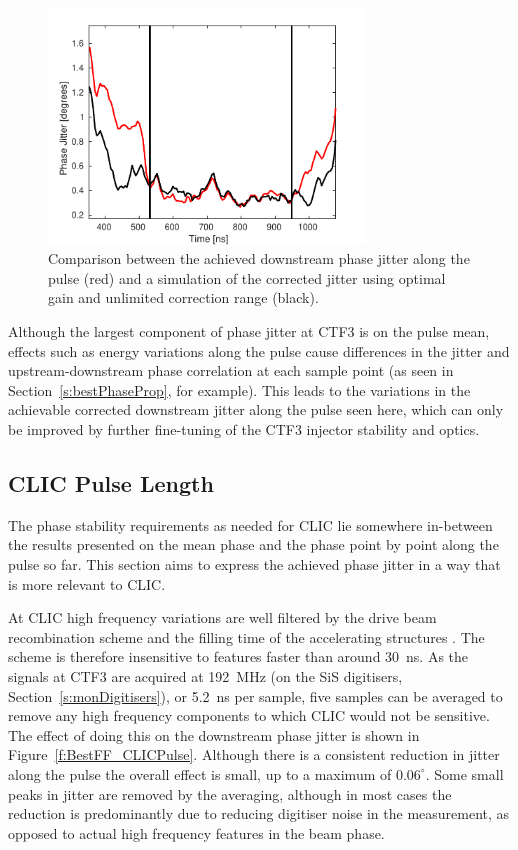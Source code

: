 \begin{figure}
  \centering
  \includegraphics[width=0.75\textwidth]{Figures/feedforward/BestFF_SimStdAlongPulse}
  \caption{Comparison between the achieved downstream phase jitter along the pulse (red) and a simulation of the corrected jitter using optimal gain and unlimited correction range (black).}
  \label{f:BestFF_SimStdPhaseAlong}
\end{figure}

Although the largest component of phase jitter at CTF3 is on the pulse mean, effects such as energy variations along the pulse cause differences in the jitter and upstream-downstream phase correlation at each sample point (as seen in Section~\ref{s:bestPhaseProp}, for example). This leads to the variations in the achievable corrected downstream jitter along the pulse seen here, which can only be improved by further fine-tuning of the CTF3 injector stability and optics.

\subsection{CLIC Pulse Length}
\label{ss:jitterCLICPulse}

The phase stability requirements as needed for CLIC lie somewhere in-between the results presented
on the mean phase and the phase point by point along the pulse so far. This section aims to express the achieved phase jitter in a way that is more relevant to CLIC.

At CLIC high frequency
variations are well filtered by the drive beam recombination scheme and the filling time
of the accelerating structures \cite{alexThesis}. The scheme is therefore insensitive to 
features faster than around 30~ns. As the signals at CTF3 are acquired at 192~MHz (on the
SiS digitisers, Section~\ref{s:monDigitisers}), or 5.2~ns per sample, five samples can be
averaged to remove any high frequency components to which CLIC would not be sensitive. The effect of doing this on the downstream phase jitter is shown in Figure~\ref{f:BestFF_CLICPulse}. Although there is a consistent reduction in jitter along the pulse the overall effect is small, up to a maximum of \(0.06^\circ\). 
Some small peaks in jitter are removed by the averaging, although in most cases the reduction is predominantly due to reducing digitiser noise in the measurement, as opposed to actual high frequency features in the beam phase.

